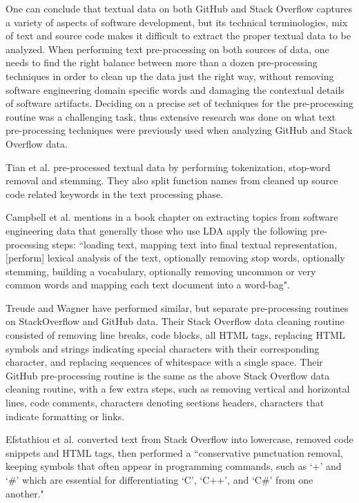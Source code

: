     One can conclude that textual data on both GitHub and Stack Overflow captures a variety of aspects of software development, but its technical terminologies, mix of text and source code makes it difficult to extract the proper textual data to be analyzed. When performing text pre-processing on both sources of data, one needs to find the right balance between more than a dozen pre-processing techniques in order to clean up the data just the right way, without removing software engineering domain specific words and damaging the contextual details of software artifacts. Deciding on a precise set of techniques for the pre-processing routine was a challenging task, thus extensive research was done on what text pre-processing techniques were previously used when analyzing GitHub and Stack Overflow data.
    
    Tian et al. \cite{tian2013predicting} pre-processed textual data by performing tokenization, stop-word removal and stemming. They also split function names from cleaned up source code related keywords in the text processing phase.
    
    Campbell et al. \cite{campbell2015latent} mentions in a book chapter on extracting topics from software engineering data that generally those who use LDA apply the following pre-processing steps: ``loading text, mapping text into final textual representation, [perform] lexical analysis of the text, optionally removing stop words, optionally stemming, building a vocabulary, optionally removing uncommon or very common words and mapping each text document into a word-bag".
    
    Treude and Wagner \cite{treude2019predicting} have performed similar, but separate pre-processing routines on StackOverflow and GitHub data. Their Stack Overflow data cleaning routine consisted of removing line breaks, code blocks, all HTML tags, replacing HTML symbols and strings indicating special characters with their corresponding character, and replacing sequences of whitespace with a single space. Their GitHub pre-processing routine is the same as the above Stack Overflow data cleaning routine, with a few extra steps, such as removing vertical and horizontal lines, code comments, characters denoting sections headers, characters that indicate formatting or links. 
    
    Efstathiou et al. \cite{efstathiou2018word} converted text from Stack Overflow into lowercase, removed code snippets and HTML tags, then performed a ``conservative punctuation removal, keeping symbols that often appear in programming commands, such as ‘+’ and ‘\#’ which are essential for differentiating ‘C’, ‘C++’, and ‘C\#’ from one another."
    
